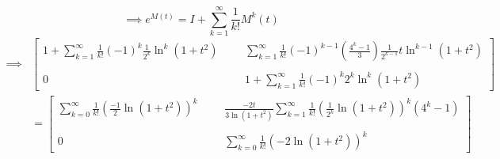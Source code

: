 \begin{equation*}
    \implies
    e^{M(t)}
      =
    I + \sum_{k=1}^{\infty} \frac{1}{k!} M^{k} (t)
\end{equation*}
\begin{align*}
    \implies
    &
    \begin{bmatrix}
        \displaystyle
        1 + \sum_{k=1}^{\infty} \frac{1}{k!} {(-1)}^{k} \frac{1}{2^k} \ln^{k}(1+t^2)
        & & &
        \displaystyle
        \sum_{k=1}^{\infty} \frac{1}{k!} {(-1)}^{k-1} \left( \frac{4^k-1}{3} \right) \frac{1}{2^{k-1}} t \ln^{k-1}(1+t^2)
        \\ \\
        0
        & & &
        \displaystyle
        1 + \sum_{k=1}^{\infty} \frac{1}{k!} {(-1)}^{k} 2^{k} \ln^{k}(1+t^2)
    \end{bmatrix}
    \\ & =
    \begin{bmatrix}
        \displaystyle
        \sum_{k=0}^{\infty} \frac{1}{k!} {\left( \frac{-1}{2} \ln(1+t^2) \right)}^{k}
        & & &
        \displaystyle
        \frac{-2t}{3\ln(1+t^2)} \sum_{k=1}^{\infty} \frac{1}{k!} {\left( \frac{1}{2^{k}} \ln(1+t^2) \right)}^{k} (4^k - 1)
        \\ \\
        0
        & & &
        \displaystyle
        \sum_{k=0}^{\infty} \frac{1}{k!} {(-2 \ln(1+t^2))}^{k}
    \end{bmatrix}
\end{align*}
